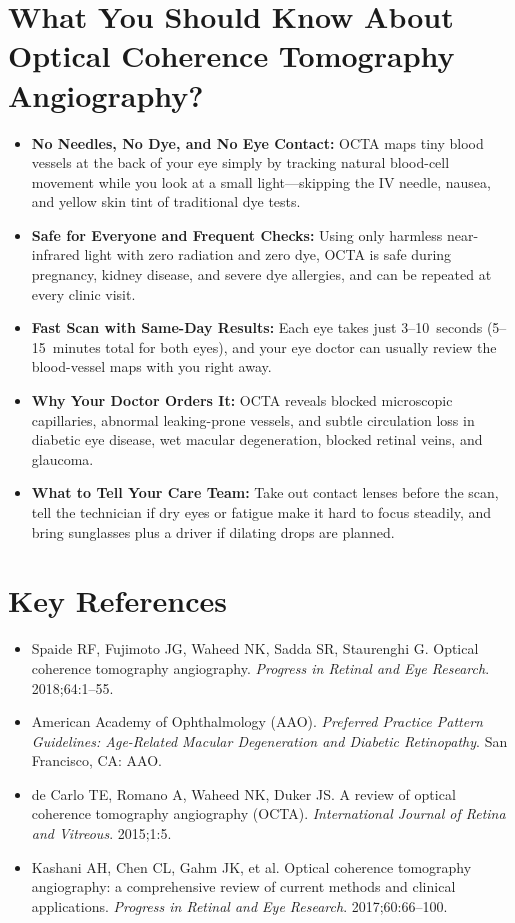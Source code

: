 \section{What You Should Know About Optical Coherence Tomography Angiography?}
\begin{itemize}
\item \textbf{No Needles, No Dye, and No Eye Contact:} OCTA maps tiny blood vessels at the back of your eye simply by tracking natural blood-cell movement while you look at a small light---skipping the IV needle, nausea, and yellow skin tint of traditional dye tests.
\item \textbf{Safe for Everyone and Frequent Checks:} Using only harmless near-infrared light with zero radiation and zero dye, OCTA is safe during pregnancy, kidney disease, and severe dye allergies, and can be repeated at every clinic visit.
\item \textbf{Fast Scan with Same-Day Results:} Each eye takes just 3--10~seconds (5--15~minutes total for both eyes), and your eye doctor can usually review the blood-vessel maps with you right away.
\item \textbf{Why Your Doctor Orders It:} OCTA reveals blocked microscopic capillaries, abnormal leaking-prone vessels, and subtle circulation loss in diabetic eye disease, wet macular degeneration, blocked retinal veins, and glaucoma.
\item \textbf{What to Tell Your Care Team:} Take out contact lenses before the scan, tell the technician if dry eyes or fatigue make it hard to focus steadily, and bring sunglasses plus a driver if dilating drops are planned.
\end{itemize}

\section{Key References}
\begin{itemize}
\item Spaide RF, Fujimoto JG, Waheed NK, Sadda SR, Staurenghi G. Optical coherence tomography angiography. \textit{Progress in Retinal and Eye Research}. 2018;64:1--55.
\item American Academy of Ophthalmology (AAO). \textit{Preferred Practice Pattern Guidelines: Age-Related Macular Degeneration and Diabetic Retinopathy}. San Francisco, CA: AAO.
\item de Carlo TE, Romano A, Waheed NK, Duker JS. A review of optical coherence tomography angiography (OCTA). \textit{International Journal of Retina and Vitreous}. 2015;1:5.
\item Kashani AH, Chen CL, Gahm JK, et al. Optical coherence tomography angiography: a comprehensive review of current methods and clinical applications. \textit{Progress in Retinal and Eye Research}. 2017;60:66--100.
\end{itemize}
